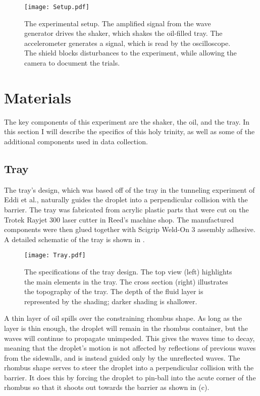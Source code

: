    
    
\begin{figure}[h!]
	\centering
	\texttt{[image: Setup.pdf]}
	\caption{The experimental setup. The amplified signal from the wave generator drives the shaker, which shakes the oil-filled tray. The accelerometer generates a signal, which is read by the oscilloscope. The shield blocks disturbances to the experiment, while allowing the camera to document the trials.}
	\label{setup}
\end{figure}

\section{Materials}
The key components of this experiment are the shaker, the oil, and the tray. In this section I will describe the specifics of this holy trinity, as well as some of the additional components used in data collection. 

\subsection{Tray}

The tray's design, which was based off of the tray in the tunneling experiment of Eddi et al., naturally guides the droplet into a perpendicular collision with the barrier. The tray was fabricated from acrylic plastic parts that were cut on the Trotek Rayjet 300 laser cutter in Reed's machine shop. The manufactured components were then glued together with Scigrip Weld-On 3 assembly adhesive.  A detailed schematic of the tray is shown in . 

\begin{figure}[h!]
	\centering
	\texttt{[image: Tray.pdf]}
	\caption{The specifications of the tray design. The top view (left) highlights the main elements in the tray. The cross section (right) illustrates the topography of the tray. The depth of the fluid layer is represented by the shading; darker shading is shallower.}
	\label{tray}
\end{figure}

A thin layer of oil spills over the constraining rhombus shape. As long as the layer is thin enough, the droplet will remain in the rhombus container, but the waves will continue to propagate unimpeded. This gives the waves time to decay, meaning that the droplet's motion is not affected by reflections of previous waves from the sidewalls, and is instead guided only by the unreflected waves. The rhombus shape serves to steer the droplet into a perpendicular collision with the barrier. It does this by forcing the droplet to pin-ball into the acute corner of the rhombus so that it shoots out towards the barrier as shown in (c).

